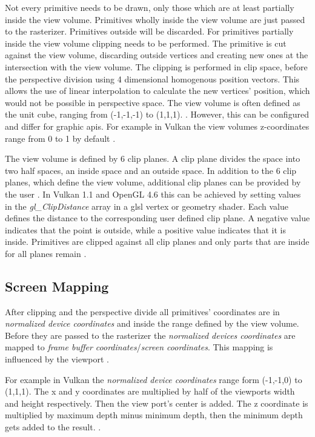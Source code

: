 Not every primitive needs to be drawn, only those which are at least partially inside the view volume. Primitives wholly inside the view volume are just passed to the rasterizer. Primitives outside will be discarded. For primitives partially inside the view volume clipping needs to be performed. The primitive is cut against the view volume, discarding outside vertices and creating new ones at the intersection with the view volume. The clipping is performed in clip space, before the perspective division using  4 dimensional homogenous position vectors. This allows the use of linear interpolation to calculate the new vertices' position, which would not be possible in perspective space. The view volume is often defined as the unit cube, ranging from (-1,-1,-1) to (1,1,1).
\cite{akine:2018:realtime}. However, this can be configured and differ for graphic \glspl{api}. For example in Vulkan the view volumes z-coordinates range from 0 to 1 by default \cite{khronos:glsl4.60:spec}.

The view volume is defined by 6 clip planes. A clip plane divides the space into two half spaces, an inside space and an outside space.
In addition to the 6 clip planes, which define the view volume, additional clip planes can be provided by the user \cite{akine:2018:realtime}. In Vulkan 1.1 and OpenGL 4.6 this can be achieved by setting values in the \textit{gl\_ClipDistance} array in a \gls{glsl} vertex or geometry shader. Each value defines the distance to the corresponding user defined clip plane. A negative value indicates that the point is outside, while a positive value indicates that it is inside.  Primitives are clipped against all clip planes and only parts that are inside for all planes remain \cite{khronos:vulkan:spec1.1, khronos:openGL:spec4.6}.

\subsection{Screen Mapping}
After clipping and the perspective divide all primitives' coordinates are in \textit{normalized device coordinates} and inside the range defined by the view volume. Before they are passed to the rasterizer the \textit{normalized devices coordinates} are mapped to \textit{frame buffer coordinates}/\textit{screen coordinates}. This mapping is influenced by the viewport \cite{akine:2018:realtime, khronos:vulkan:spec1.1}.

For example in Vulkan the \textit{normalized device coordinates} range form (-1,-1,0) to (1,1,1). The x and y coordinates are multiplied by half of the viewports width and height respectively. Then the view port's center is added. The z coordinate is multiplied by maximum depth minus minimum depth, then the minimum depth gets added to the result. \cite{khronos:vulkan:spec1.1}.

